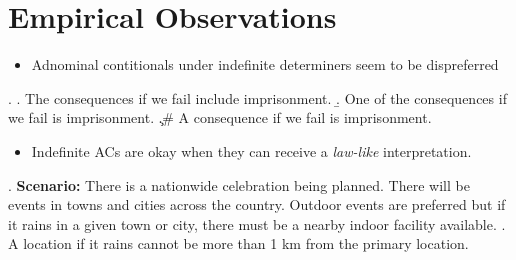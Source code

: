 \documentclass[letterpaper]{article}
\begin{document}
\section{Empirical Observations}
\begin{itemize}
	\item Adnominal contitionals under indefinite determiners seem to be dispreferred
\end{itemize}
\ex. 
\a. The consequences if we fail include imprisonment.
\b. One of the consequences if we fail is imprisonment.
\c.\# A consequence if we fail is imprisonment.

\begin{itemize}
	\item Indefinite ACs are okay when they can receive a \textit{law-like} interpretation.
\end{itemize}
\ex. \textbf{Scenario:} There is a nationwide celebration being planned. 
There will be events in towns and cities across the country.
Outdoor events are preferred but if it rains in a given town or city, there must be a nearby indoor facility available.
\a. A location if it rains cannot be more than 1 km from the primary location.

\nocite{*}
\printbibliography
\end{document}
